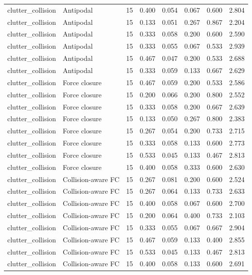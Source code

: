 {\begin{longtable}{llrrrrrr}
clutter\_collision & Antipodal & 15 & 0.400 & 0.054 & 0.067 & 0.600 & 2.804 \\
clutter\_collision & Antipodal & 15 & 0.133 & 0.051 & 0.267 & 0.867 & 2.204 \\
clutter\_collision & Antipodal & 15 & 0.333 & 0.058 & 0.200 & 0.600 & 2.590 \\
clutter\_collision & Antipodal & 15 & 0.333 & 0.055 & 0.067 & 0.533 & 2.939 \\
clutter\_collision & Antipodal & 15 & 0.467 & 0.047 & 0.200 & 0.533 & 2.688 \\
clutter\_collision & Antipodal & 15 & 0.333 & 0.059 & 0.133 & 0.667 & 2.629 \\
clutter\_collision & Force closure & 15 & 0.467 & 0.059 & 0.200 & 0.533 & 2.586 \\
clutter\_collision & Force closure & 15 & 0.200 & 0.066 & 0.200 & 0.800 & 2.552 \\
clutter\_collision & Force closure & 15 & 0.333 & 0.058 & 0.200 & 0.667 & 2.639 \\
clutter\_collision & Force closure & 15 & 0.133 & 0.050 & 0.267 & 0.800 & 2.383 \\
clutter\_collision & Force closure & 15 & 0.267 & 0.054 & 0.200 & 0.733 & 2.715 \\
clutter\_collision & Force closure & 15 & 0.333 & 0.058 & 0.133 & 0.600 & 2.773 \\
clutter\_collision & Force closure & 15 & 0.533 & 0.045 & 0.133 & 0.467 & 2.813 \\
clutter\_collision & Force closure & 15 & 0.400 & 0.058 & 0.333 & 0.600 & 2.630 \\
clutter\_collision & Collision-aware FC & 15 & 0.267 & 0.081 & 0.200 & 0.600 & 2.524 \\
clutter\_collision & Collision-aware FC & 15 & 0.267 & 0.064 & 0.133 & 0.733 & 2.633 \\
clutter\_collision & Collision-aware FC & 15 & 0.400 & 0.058 & 0.067 & 0.600 & 2.700 \\
clutter\_collision & Collision-aware FC & 15 & 0.200 & 0.064 & 0.400 & 0.733 & 2.103 \\
clutter\_collision & Collision-aware FC & 15 & 0.333 & 0.055 & 0.067 & 0.667 & 2.904 \\
clutter\_collision & Collision-aware FC & 15 & 0.467 & 0.059 & 0.133 & 0.400 & 2.855 \\
clutter\_collision & Collision-aware FC & 15 & 0.533 & 0.045 & 0.133 & 0.467 & 2.813 \\
clutter\_collision & Collision-aware FC & 15 & 0.400 & 0.058 & 0.133 & 0.600 & 2.691 \\

\end{longtable}}
